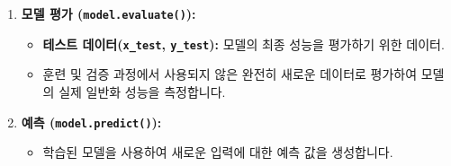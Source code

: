 \documentclass[11pt,a4paper]{article}
\theoremstyle{definition}
\begin{document}
\begin{enumerate}
\begin{itemize}
        \item \textbf{배치 크기(\texttt{batch_size}):} 한 번의 가중치 업데이트에 사용될 샘플 수.
        \item \textbf{검증 데이터(\texttt{validation_data}):} 훈련 중 모델의 일반화 성능을 평가하기 위한 데이터.
        \item \textbf{콜백(\texttt{callbacks}):} EarlyStopping, ModelCheckpoint 등을 사용하여 학습 과정 제어.
    \end{itemize}
    \item \textbf{모델 평가 (\texttt{model.evaluate()}):}
    \begin{itemize}
        \item \textbf{테스트 데이터(\texttt{x_test}, \texttt{y_test}):} 모델의 최종 성능을 평가하기 위한 데이터.
        \item 훈련 및 검증 과정에서 사용되지 않은 완전히 새로운 데이터로 평가하여 모델의 실제 일반화 성능을 측정합니다.
    \end{itemize}
    \item \textbf{예측 (\texttt{model.predict()}):}
    \begin{itemize}
        \item 학습된 모델을 사용하여 새로운 입력에 대한 예측 값을 생성합니다.
    \end{itemize}
\end{enumerate}
\end{document}
